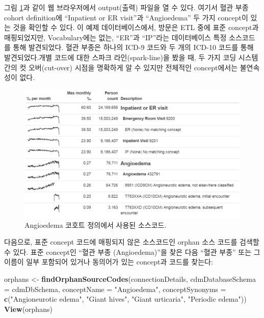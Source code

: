 \documentclass[11pt]{book}
\newenvironment{Shaded}{\begin{snugshade}}{\end{snugshade}}
\newcommand{\KeywordTok}[1]{\textcolor[rgb]{0.13,0.29,0.53}{\textbf{#1}}}
\newcommand{\DataTypeTok}[1]{\textcolor[rgb]{0.13,0.29,0.53}{#1}}
\newcommand{\StringTok}[1]{\textcolor[rgb]{0.31,0.60,0.02}{#1}}
\newcommand{\NormalTok}[1]{#1}
\theoremstyle{definition}
\theoremstyle{definition}
\theoremstyle{definition}
\theoremstyle{remark}
\begin{document}
그림 \ref{fig:sourceCodesAngioedema}과 같이 웹 브라우저에서 output(출력)
파일을 열 수 있다. 여기서 혈관 부종 cohort definition에 ``Inpatient or
ER visit''과 ``Angioedema'' 두 가지 concept이 있는 것을 확인할 수 있다.
이 예제 데이터베이스에서, 방문은 ETL 중에 표준 concept과 매핑되었지만,
Vocabulary에는 없는, ``ER''과 ``IP''라는 데이터베이스 특정 소스코드를
통해 발견되었다. 혈관 부종은 하나의 ICD-9 코드와 두 개의 ICD-10 코드를
통해 발견되었다.개별 코드에 대한 스파크 라인(spark-line)을 봤을 때, 두
가지 코딩 시스템 간의 컷 오버(cut-over) 시점을 명확하게 알 수 있지만
전체적인 concept에서는 불연속성이 없다.

\begin{figure}

{\centering \includegraphics[width=1\linewidth]{images/DataQuality/sourceCodesAngioedema} 

}

\caption{Angioedema 코호트 정의에서 사용된 소스코드.}\label{fig:sourceCodesAngioedema}
\end{figure}

다음으로, 표준 concept 코드에 매핑되지 않은 소스코드인 orphan 소스
코드를 검색할 수 있다. 표준 concept인 ``혈관 부종 (Angioedema)''을 찾은
다음 ``혈관 부종'' 또는 그 이름이 일부 포함되어 있거나 동의어가 있는
concept과 코드를 찾는다:

\begin{Shaded}
\begin{Highlighting}[]
\NormalTok{orphans <-}\StringTok{ }\KeywordTok{findOrphanSourceCodes}\NormalTok{(connectionDetails,}
                                 \DataTypeTok{cdmDatabaseSchema =}\NormalTok{ cdmDbSchema,}
                                 \DataTypeTok{conceptName =} \StringTok{"Angioedema"}\NormalTok{,}
                                 \DataTypeTok{conceptSynonyms =} \KeywordTok{c}\NormalTok{(}\StringTok{"Angioneurotic edema"}\NormalTok{,}
                                                     \StringTok{"Giant hives"}\NormalTok{,}
                                                     \StringTok{"Giant urticaria"}\NormalTok{,}
                                                     \StringTok{"Periodic edema"}\NormalTok{))}
\KeywordTok{View}\NormalTok{(orphans)}
\end{Highlighting}
\end{Shaded}
\end{document}
